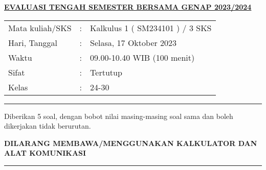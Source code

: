 \documentclass[10pt,openany,a4paper]{article}
\renewcommand{\headrulewidth}{0pt}
\begin{document}
    \newpage

    \fancyhead{}
    \fancyhead[r]{}
    \renewcommand{\headrulewidth}{0pt}

    \begin{center}
	{\underline{\textbf{\MakeUppercase{Evaluasi Tengah Semester Bersama Genap 2023/2024}}}}
    \end{center}

    \begin{center}
	\begin{tabular}{lcl}
		Mata kuliah/SKS & : & Kalkulus 1 ( SM234101 ) / 3 SKS\\
		Hari, Tanggal & : & Selasa, 17 Oktober 2023\\
		Waktu & : & 09.00-10.40 WIB (100 menit)\\
		Sifat & : & Tertutup\\
		Kelas & : & 24-30
	\end{tabular}
    \end{center}
	
    \noindent\rule{\textwidth}{2.pt}
	
    \setlength{\parindent}{5pt}
    \par Diberikan 5 soal, dengan bobot nilai masing-masing soal sama dan boleh dikerjakan tidak berurutan.
    \setlength{\parindent}{5pt}
    \setlength{\parindent}{5pt}
    {\small
    \par \textbf{\MakeUppercase{Dilarang membawa/menggunakan kalkulator dan alat komunikasi}}
    }
    \par {}
	
    \noindent\rule{\textwidth}{2.pt}
	
\end{document}
